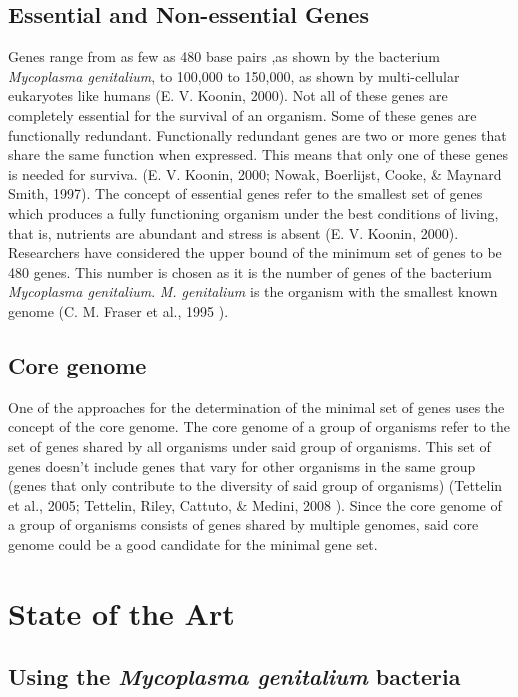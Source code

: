 \documentclass[]{report}
\begin{document}
\subsection{Essential and Non-essential
Genes}\label{essential-and-non-essential-genes}

Genes range from as few as 480 base pairs ,as shown by the bacterium
\emph{Mycoplasma genitalium}, to 100,000 to 150,000, as shown by
multi-cellular eukaryotes like humans (E. V. Koonin, 2000). Not all of
these genes are completely essential for the survival of an organism.
Some of these genes are functionally redundant. Functionally redundant
genes are two or more genes that share the same function when expressed.
This means that only one of these genes is needed for surviva. (E. V.
Koonin, 2000; Nowak, Boerlijst, Cooke, \& Maynard Smith, 1997). The
concept of essential genes refer to the smallest set of genes which
produces a fully functioning organism under the best conditions of
living, that is, nutrients are abundant and stress is absent (E. V.
Koonin, 2000). Researchers have considered the upper bound of the
minimum set of genes to be 480 genes. This number is chosen as it is the
number of genes of the bacterium \emph{Mycoplasma genitalium}. \emph{M.
genitalium} is the organism with the smallest known genome (C. M. Fraser
et al., 1995 ).

\subsection{Core genome}\label{core-genome}

One of the approaches for the determination of the minimal set of genes
uses the concept of the core genome. The core genome of a group of
organisms refer to the set of genes shared by all organisms under said
group of organisms. This set of genes doesn't include genes that vary
for other organisms in the same group (genes that only contribute to the
diversity of said group of organisms) (Tettelin et al., 2005; Tettelin,
Riley, Cattuto, \& Medini, 2008 ). Since the core genome of a group of
organisms consists of genes shared by multiple genomes, said core genome
could be a good candidate for the minimal gene set.

\section{State of the Art}\label{state-of-the-art}

\subsection{\texorpdfstring{Using the \emph{Mycoplasma genitalium}
bacteria}{Using the Mycoplasma genitalium bacteria}}\label{using-the-mycoplasma-genitalium-bacteria}
\end{document}
